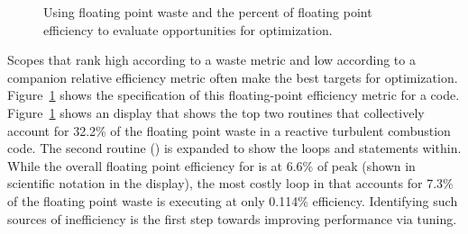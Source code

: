\documentclass[11pt,letterpaper]{report}
\begin{document}
\begin{figure}[t]
\caption{Using floating point waste and the percent of floating point efficiency to evaluate opportunities for optimization.}
\label{fig:fpefficiency-loop}
\end{figure}

Scopes that rank high according to a waste metric and low according to a companion relative efficiency metric often make the best targets for optimization.
Figure~\ref{fig:fpefficiency-loop} shows the specification of this floating-point efficiency metric for a code.
Figure~\ref{fig:fpefficiency-loop} shows an \hpcviewer{} display that shows the top two routines that collectively account for 32.2\% of the floating point waste in a reactive turbulent combustion code.
The second routine () is expanded to show the loops and statements within.
While the overall floating point efficiency for  is at 6.6\% of peak (shown in scientific notation in the \hpcviewer{} display), the most costly loop in  that accounts for 7.3\% of the floating point waste is executing at only 0.114\% efficiency.
 Identifying such sources of inefficiency is the first step towards improving performance via tuning.


\end{document}
